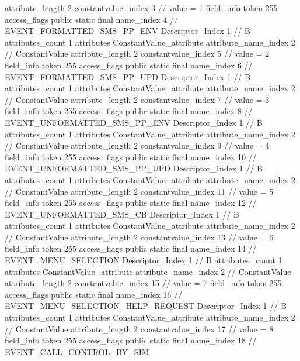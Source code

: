 {{{{{{{					attribute_length	2
					constantvalue_index	3		// value = 1
				}
				}
			}
			field_info {
				token	255
				access_flags	public static final
				name_index	4		// EVENT_FORMATTED_SMS_PP_ENV
				Descriptor_Index	1		// B
				attributes_count	1
				attributes {
				ConstantValue_attribute {
					attribute_name_index	2		// ConstantValue
					attribute_length	2
					constantvalue_index	5		// value = 2
				}
				}
			}
			field_info {
				token	255
				access_flags	public static final
				name_index	6		// EVENT_FORMATTED_SMS_PP_UPD
				Descriptor_Index	1		// B
				attributes_count	1
				attributes {
				ConstantValue_attribute {
					attribute_name_index	2		// ConstantValue
					attribute_length	2
					constantvalue_index	7		// value = 3
				}
				}
			}
			field_info {
				token	255
				access_flags	public static final
				name_index	8		// EVENT_UNFORMATTED_SMS_PP_ENV
				Descriptor_Index	1		// B
				attributes_count	1
				attributes {
				ConstantValue_attribute {
					attribute_name_index	2		// ConstantValue
					attribute_length	2
					constantvalue_index	9		// value = 4
				}
				}
			}
			field_info {
				token	255
				access_flags	public static final
				name_index	10		// EVENT_UNFORMATTED_SMS_PP_UPD
				Descriptor_Index	1		// B
				attributes_count	1
				attributes {
				ConstantValue_attribute {
					attribute_name_index	2		// ConstantValue
					attribute_length	2
					constantvalue_index	11		// value = 5
				}
				}
			}
			field_info {
				token	255
				access_flags	public static final
				name_index	12		// EVENT_UNFORMATTED_SMS_CB
				Descriptor_Index	1		// B
				attributes_count	1
				attributes {
				ConstantValue_attribute {
					attribute_name_index	2		// ConstantValue
					attribute_length	2
					constantvalue_index	13		// value = 6
				}
				}
			}
			field_info {
				token	255
				access_flags	public static final
				name_index	14		// EVENT_MENU_SELECTION
				Descriptor_Index	1		// B
				attributes_count	1
				attributes {
				ConstantValue_attribute {
					attribute_name_index	2		// ConstantValue
					attribute_length	2
					constantvalue_index	15		// value = 7
				}
				}
			}
			field_info {
				token	255
				access_flags	public static final
				name_index	16		// EVENT_MENU_SELECTION_HELP_REQUEST
				Descriptor_Index	1		// B
				attributes_count	1
				attributes {
				ConstantValue_attribute {
					attribute_name_index	2		// ConstantValue
					attribute_length	2
					constantvalue_index	17		// value = 8
				}
				}
			}
			field_info {
				token	255
				access_flags	public static final
				name_index	18		// EVENT_CALL_CONTROL_BY_SIM
}}}}}
